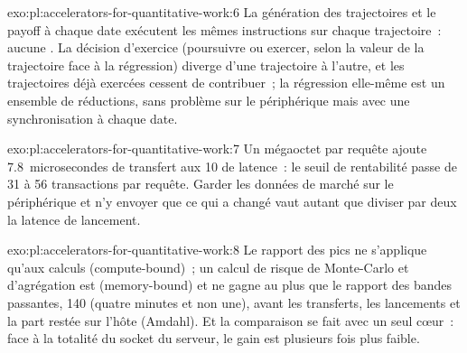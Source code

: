 \begin{solution}{exo:pl:accelerators-for-quantitative-work:6}
La génération des trajectoires et le payoff à chaque date exécutent les mêmes instructions sur chaque trajectoire~: aucune . La décision d'exercice (poursuivre ou
exercer, selon la valeur de la trajectoire face à la régression) diverge d'une trajectoire à l'autre, et les trajectoires déjà exercées cessent de contribuer~; la
régression elle-même est un ensemble de réductions, sans problème sur le périphérique mais avec une synchronisation à chaque date.
\end{solution}

\begin{solution}{exo:pl:accelerators-for-quantitative-work:7}
Un mégaoctet par requête ajoute 7.8~microsecondes de transfert aux 10 de latence~: le seuil de rentabilité passe de 31 à 56 transactions par requête. Garder les
données de marché sur le périphérique et n'y envoyer que ce qui a changé vaut autant que diviser par deux la latence de lancement.
\end{solution}

\begin{solution}{exo:pl:accelerators-for-quantitative-work:8}
Le rapport des pics ne s'applique qu'aux calculs  (compute-bound)~; un calcul de risque de Monte-Carlo et d'agrégation est  (memory-bound) et ne gagne au plus que le rapport des
bandes passantes, 140 (quatre minutes et non une), avant les transferts, les lancements et la part restée sur l'hôte (Amdahl). Et la comparaison se fait avec un seul cœur~: face à
la totalité du socket du serveur, le gain est plusieurs fois plus faible.
\end{solution}

